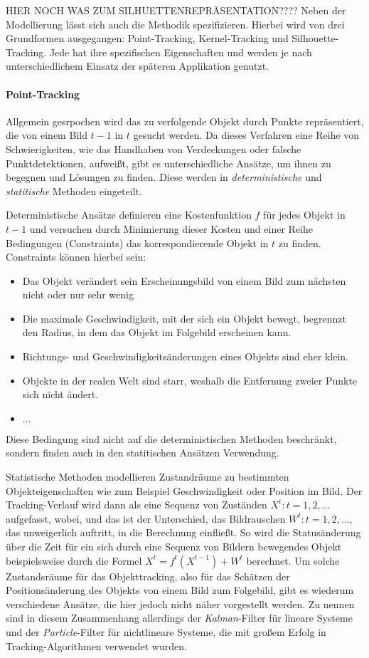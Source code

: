 HIER NOCH WAS ZUM SILHUETTENREPRÄSENTATION????
Neben der Modellierung lässt sich auch die Methodik spezifizieren. Hierbei wird von drei Grundformen ausgegangen: Point-Tracking, Kernel-Tracking und Silhouette-Tracking. Jede hat ihre spezifischen Eigenschaften und werden je nach unterschiedlichem Einsatz der späteren Applikation genutzt.

\paragraph{Point-Tracking}
Allgemein gesrpochen wird das zu verfolgende Objekt durch Punkte repräsentiert, die von einem Bild $t-1$ in $t$ gesucht werden. Da dieses Verfahren eine Reihe von Schwierigkeiten, wie das Handhaben von Verdeckungen oder falsche Punktdetektionen, aufweißt, gibt es unterschiedliche Ansätze, um ihnen zu begegnen und Lösungen zu finden. Diese werden in \textit{deterministische} und \textit{statitische} Methoden eingeteilt. 

Deterministische Ansätze definieren eine Kostenfunktion $f$ für jedes Objekt in $t-1$ und versuchen durch Minimierung dieser Kosten und einer Reihe Bedingungen (Constraints) das korrespondierende Objekt in $t$ zu finden. Constraints können hierbei sein:

\begin{itemize}
\item Das Objekt verändert sein Erscheinungsbild von einem Bild zum nächsten nicht oder nur sehr wenig \cite{FPIS}
\item Die maximale Geschwindigkeit, mit der sich ein Objekt bewegt, begrennzt den Radius, in dem das Objekt im Folgebild erscheinen kann.
\item Richtungs- und Geschwindigkeitsänderungen eines Objekts sind eher klein.
\item Objekte in der realen Welt sind starr, weshalb die Entfernung zweier Punkte sich nicht ändert.
\item $\dots$
\end{itemize}
Diese Bedingung sind nicht auf die deterministischen Methoden beschränkt, sondern finden auch in den statitischen Ansätzen Verwendung. 

Statistische Methoden modellieren Zustandräume zu bestimmten Objekteigenschaften wie zum Beispiel Geschwindigkeit oder Position im Bild. Der Tracking-Verlauf wird dann als eine Sequenz von Zuständen $X^{t}:t=1,2,\dots$ aufgefasst, wobei, und das ist der Unterschied, das Bildrauschen $W^{t}:t=1,2,\dots$, das unweigerlich auftritt, in die Berechnung einfließt. So wird die Statusänderung über die Zeit für ein sich durch eine Sequenz von Bildern bewegendes Objekt beispielsweise durch die Formel $X^{t}=f^{t}(X^{t-1})+W^{t}$ berechnet. Um solche Zustandsräume für das Objekttracking, also für das Schätzen der Positionsänderung des Objekts von einem Bild zum Folgebild, gibt es wiederum verschiedene Ansätze, die hier jedoch nicht näher vorgestellt werden. Zu nennen sind in diesem Zusammenhang allerdings der \textit{Kalman}-Filter\cite{KAF} für lineare Systeme und der \textit{Particle}-Filter \cite{PAF} für nichtlineare Systeme, die mit großem Erfolg in Tracking-Algorithmen verwendet wurden.

